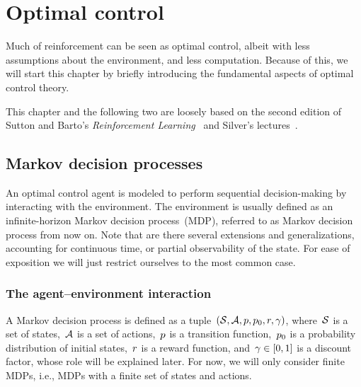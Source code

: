\chapter{Optimal control} \label{ch:optimal_control}
Much of reinforcement can be seen as optimal control, albeit with less assumptions about the environment, and less computation. Because of this, we will start this chapter by briefly introducing the fundamental aspects of optimal control theory.

This chapter and the following two are loosely based on the second edition of Sutton and Barto's \textit{Reinforcement Learning}~\cite{sutton2018reinforcement} and Silver's lectures~\cite{silver2015lectures}.

\section{Markov decision processes}
An optimal control agent is modeled to perform sequential decision-making by interacting with the environment. The environment is usually defined as an infinite-horizon Markov decision process~(MDP), referred to as Markov decision process from now on. Note that are there several extensions and generalizations, accounting for continuous time, or partial observability of the state. For ease of exposition we will just restrict ourselves to the most common case.

\subsection{The agent--environment interaction}
A Markov decision process is defined as a tuple~${\left(\mathcal{S},\mathcal{A},p,p_{0},r,\gamma\right)}$, where~${\mathcal{S}}$ is a set of states,~${\mathcal{A}}$ is a set of actions,~${p}$ is a transition function,~${p_{0}}$ is a probability distribution of initial states,~${r}$ is a reward function, and~${\gamma\in\left[0,1\right]}$ is a discount factor, whose role will be explained later. For now, we will only consider finite MDPs, i.e., MDPs with a finite set of states and actions.

